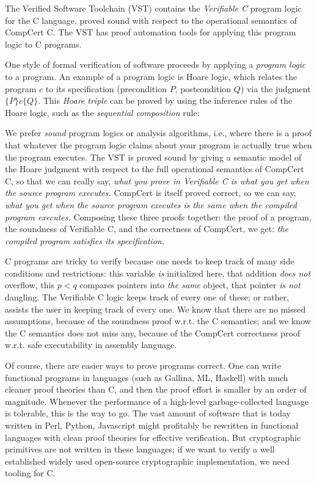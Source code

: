 \documentclass[prodmode,acmtoplas]{acmsmall}
\begin{document}
The Verified Software Toolchain (VST) \cite{appel14:plcc}
contains the \emph{Verifiable C} program logic for the C language,
proved sound with respect to the operational
semantics of CompCert C.  The VST has
proof automation tools for applying this program logic
to C programs.

One style of formal verification of software proceeds
by applying a \emph{program logic}
to a program.  An example of a program logic
is Hoare logic, which relates the program
$c$ to its specification (precondition
$P$, postcondition $Q$) via the 
judgment $\{P\} c \{Q\}$.  This 
\emph{Hoare triple} can be proved by 
using the inference rules of the Hoare logic,
such as the \emph{sequential composition} rule:

{}

We prefer \emph{sound} program logics
or analysis algorithms, i.e., where there
is a proof that whatever the program logic claims
about your program is actually true when the program
executes. The VST is proved sound by giving a semantic
model of the Hoare judgment with respect to the
full operational semantics of CompCert C, so that
we can really say, \emph{what you prove in Verifiable
C is what you get when the source program executes.}
CompCert is itself proved correct, so we can say,
\emph{what you get when the source program executes
is the same when the compiled program executes.}
Composing these three proofs together: 
the proof of a program, the soundness of Verifiable C,
and the correctness of CompCert,
we get: \emph{the compiled program satisfies its 
specification.}

C programs are tricky to verify because one needs to keep
track of many side conditions and restrictions:
this variable \emph{is} initialized here,
that addition \emph{does not} overflow,
this $p<q$ compares pointers into \emph{the same}
object, that pointer \emph{is not} dangling.
The Verifiable C logic keeps track of every one of these;
or rather, assists the user in keeping track of every one.
We know that there are no missed assumptions,
because of the soundness proof w.r.t. the C semantics;
and we know the C semantics does not miss any,
because of the CompCert correctness proof w.r.t.
safe executability in assembly language.

Of course, there are easier ways to prove programs
correct.  One can write functional programs in languages
(such as Gallina, ML, Haskell) 
with much cleaner proof theories than C, and then 
the proof effort is smaller by an order of magnitude.
Whenever the performance of a high-level garbage-collected
language is tolerable, this is the way to go.  The
vast amount of software that is today written in Perl, Python,
Javascript might profitably be rewritten in functional
languages with clean proof theories for effective verification.
But cryptographic primitives are not written in these languages;
if we want to verify a well established widely used open-source
cryptographic implementation, we need tooling for C.
\end{document}
